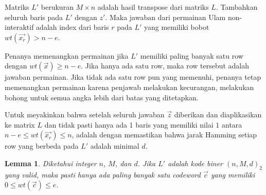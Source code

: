\documentclass[conference,compsoc]{IEEEtran}
\newtheorem{lemma}[theorem]{Lemma}
\begin{document}
Matriks $L'$ berukuran $M \times n$ adalah hasil transpose dari matriks $L$. Tambahkan seluruh baris pada $L'$ dengan $z'$. Maka jawaban dari permainan Ulam non-interaktif adalah index dari baris $r$ pada $L'$ yang memiliki bobot $wt(\vec{x_r}) > n-e$.

Penanya memenangkan permainan jika $L'$ memiliki paling banyak satu row dengan $wt(\vec{x}) \ge n-e$. Jika hanya ada satu row, maka row tersebut adalah jawaban permainan. Jika tidak ada satu row pun yang memenuhi, penanya tetap memenangkan permainan karena penjawab melakukan kecurangan, melakukan bohong untuk semua angka lebih dari batas yang ditetapkan.

Untuk meyakinkan bahwa setelah seluruh jawaban $\vec{z}$ diberikan dan diaplikasikan ke matrix $L$ dan tidak pasti hanya ada 1 baris yang memiliki nilai $1$ antara $n-e \le wt(\vec{x_r}) \le n$, adalah dengan memastikan bahwa jarak Hamming setiap row yang berbeda pada $L'$ adalah minimal $d$.

\begin{lemma}
Diketahui integer $n$, $M$, dan $d$. Jika $L'$ adalah kode biner $(n,M,d)_2$ yang valid, maka pasti hanya ada paling banyak satu codeword $\vec{c}$ yang memiliki $0 \le wt(\vec{c}) \le e$.
\end{lemma}
\end{document}
